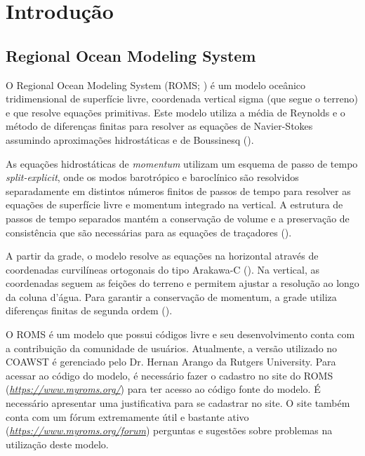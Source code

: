 \chapter{Introdução}

\bigskip

\section{Regional Ocean Modeling System}
\bigskip
\noindent O Regional Ocean Modeling System (ROMS; \cite{Shchepetkin2005}) é um modelo oceânico tridimensional de superfície livre, 
          coordenada vertical sigma (que segue o terreno) e que resolve equações primitivas. Este modelo utiliza a média de Reynolds 
          e o método de diferenças finitas para resolver as equações de Navier-Stokes assumindo aproximações hidrostáticas 
          e de Boussinesq (\cite{Haidvogel2008}).
\bigskip

\noindent As equações hidrostáticas de \textit{momentum} utilizam um esquema de passo de tempo \textit{split-explicit}, 
          onde os modos barotrópico e baroclínico são resolvidos separadamente em distintos números finitos de passos
          de tempo para resolver as equações de superfície livre e momentum integrado na vertical. A estrutura de passos
          de tempo separados mantém a conservação de volume e a preservação de consistência que são necessárias para as equações 
          de traçadores (\cite{Shchepetkin2005,Haidvogel2008}).
\bigskip

\noindent A partir da grade, o modelo resolve as equações na horizontal através de coordenadas curvilíneas ortogonais do 
          tipo Arakawa-C (\cite{Arakawa1977}). Na vertical, as coordenadas seguem as feições do terreno e permitem ajustar a 
          resolução ao longo da coluna d'água. Para garantir a conservação de momentum, a grade utiliza diferenças finitas de
          segunda ordem (\cite{Haidvogel2008}).
\bigskip

\noindent O ROMS é um modelo que possui códigos livre e seu desenvolvimento conta com a contribuição da comunidade de usuários.
          Atualmente, a versão utilizado no COAWST é gerenciado pelo Dr. Hernan Arango da Rutgers University. Para acessar ao 
          código do modelo, é necessário fazer o cadastro no site do ROMS 
          (\textcolor{bleu_cite}{\href{https://www.myroms.org/}{\textit{https://www.myroms.org/}}}) para ter acesso ao código 
          fonte do modelo. É necessário apresentar uma justificativa para se cadastrar no site. O site também conta com um fórum 
          extremamente útil e bastante ativo (\textcolor{bleu_cite}{\href{https://www.myroms.org/forum}{\textit{https://www.myroms.org/forum}}}) 
          perguntas e sugestões sobre problemas na utilização deste modelo.
\bigskip

